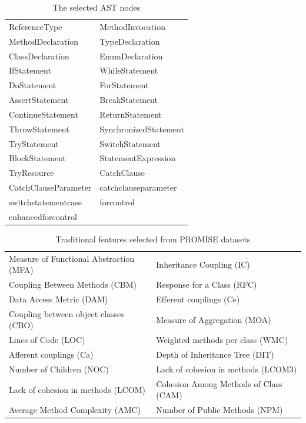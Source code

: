 \documentclass[journal]{IEEEtran}
\begin{document}
\begin{table}[htbp]
	\footnotesize
	\caption{The selected AST nodes}
	\label{tab2}
	\tabcolsep 22pt
	\centering
	\begin{tabular}{ll}
		\toprule
		ReferenceType        & MethodInvocation \\
		MethodDeclaration    & TypeDeclaration\\
		ClassDeclaration     & EnumDeclaration\\
		IfStatement          & WhileStatement        \\
		DoStatement          & ForStatement          \\
		AssertStatement      & BreakStatement        \\
		ContinueStatement    & ReturnStatement       \\
		ThrowStatement       & SynchronizedStatement \\
		TryStatement         & SwitchStatement       \\
		BlockStatement       & StatementExpression   \\
		TryResource          & CatchClause           \\
		CatchClauseParameter & catchclauseparameter  \\
		switchstatementcase  & forcontrol            \\
		enhancedforcontrol   &                \\
		\bottomrule
	\end{tabular}
\end{table}


\begin{table}[htbp]
	\footnotesize
	\caption{Traditional features selected from PROMISE datasets}
	\label{tab3}
	\tabcolsep 50pt
	\centering
	\begin{tabular}{ll}
		\toprule
		Measure of Functional Abstraction (MFA) & Inheritance Coupling (IC)             \\
		Coupling Between Methods (CBM)          & Response for a Class (RFC)            \\
		Data Access Metric (DAM)                & Efferent couplings (Ce)               \\
		Coupling between object classes (CBO)   & Measure of Aggregation (MOA)          \\
		Lines of Code (LOC)                     & Weighted methods per class (WMC)      \\
		Afferent couplings (Ca)                 & Depth of Inheritance Tree (DIT)       \\
		Number of Children (NOC)                & Lack of cohesion in methods (LCOM3)   \\
		Lack of cohesion in methods (LCOM)      & Cohesion Among Methods of Class (CAM) \\
		Average Method Complexity (AMC)         & Number of Public Methods (NPM)\\
		\bottomrule
	\end{tabular}
\end{table}
\end{document}
